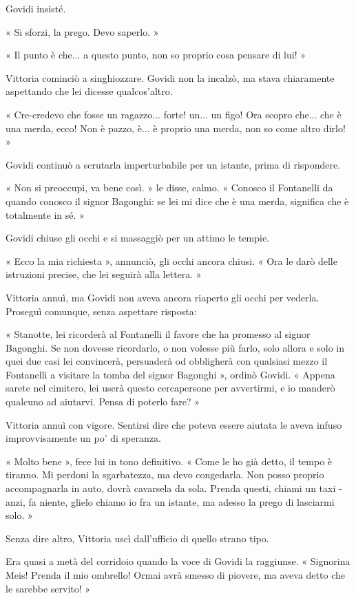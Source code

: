 Govidi insisté.

« Si sforzi, la prego. Devo saperlo. »

« Il punto è che... a questo punto, non so proprio cosa pensare di lui! »

Vittoria cominciò a singhiozzare. Govidi non la incalzò, ma stava chiaramente aspettando che lei dicesse qualcos'altro.

« Cre-credevo che fosse un ragazzo... forte! un... un figo! Ora scopro che... che è una merda, ecco! Non è pazzo, è... è proprio una merda, non so come altro dirlo! »

Govidi continuò a scrutarla imperturbabile per un istante, prima di rispondere.

« Non si preoccupi, va bene così. » le disse, calmo. « Conosco il Fontanelli da quando conosco il signor Bagonghi: se lei mi dice che è una merda, significa che è totalmente in sé. »

Govidi chiuse gli occhi e si massaggiò per un attimo le tempie.

« Ecco la mia richiesta », annunciò, gli occhi ancora chiusi. « Ora le darò delle istruzioni precise, che lei seguirà alla lettera. »

Vittoria annuì, ma Govidi non aveva ancora riaperto gli occhi per vederla. Proseguì comunque, senza aspettare risposta:

« Stanotte, lei ricorderà al Fontanelli il favore che ha promesso al signor Bagonghi. Se non dovesse ricordarlo, o non volesse più farlo, solo allora e solo in quei due casi lei convincerà, persuaderà od obbligherà con qualsiasi mezzo il Fontanelli a visitare la tomba del signor Bagonghi », ordinò Govidi. « Appena sarete nel cimitero, lei userà questo cercapersone per avvertirmi, e io manderò qualcuno ad aiutarvi. Pensa di poterlo fare? »

Vittoria annuì con vigore. Sentirsi dire che poteva essere aiutata le aveva infuso improvvisamente un po' di speranza.

« Molto bene », fece lui in tono definitivo. « Come le ho già detto, il tempo è tiranno. Mi perdoni la sgarbatezza, ma devo congedarla. Non posso proprio accompagnarla in auto, dovrà cavarsela da sola. Prenda questi, chiami un taxi - anzi, fa niente, glielo chiamo io fra un istante, ma adesso la prego di lasciarmi solo. »

Senza dire altro, Vittoria uscì dall'ufficio di quello strano tipo.

Era quasi a metà del corridoio quando la voce di Govidi la raggiunse. « Signorina Meis! Prenda il mio ombrello! Ormai avrà smesso di piovere, ma aveva detto che le sarebbe servito! »
